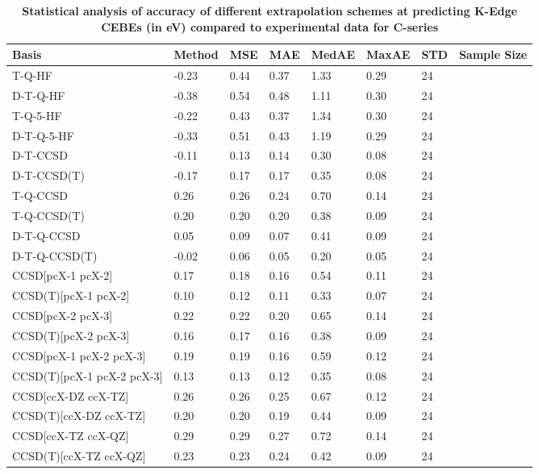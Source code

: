 \begin{table}
  \caption{\textbf{Statistical analysis of accuracy of different extrapolation schemes at predicting K-Edge CEBEs (in eV) compared to experimental data for C-series}}
  \label{tbl:extrap-scheme-summary-c}
  \begin{tabular}{l l l l l l l l }
    \toprule
    \textbf{Basis} & \textbf{Method} & \textbf{MSE} & \textbf{MAE} & \textbf{MedAE} & \textbf{MaxAE} & \textbf{STD} & \textbf{Sample Size} \\ 
    \midrule
    T-Q-HF & -0.23 & 0.44 & 0.37 & 1.33 & 0.29 & 24 \\ 
    D-T-Q-HF & -0.38 & 0.54 & 0.48 & 1.11 & 0.30 & 24 \\ 
    T-Q-5-HF & -0.22 & 0.43 & 0.37 & 1.34 & 0.30 & 24 \\ 
    D-T-Q-5-HF & -0.33 & 0.51 & 0.43 & 1.19 & 0.29 & 24 \\ 
    D-T-CCSD & -0.11 & 0.13 & 0.14 & 0.30 & 0.08 & 24 \\ 
    D-T-CCSD(T) & -0.17 & 0.17 & 0.17 & 0.35 & 0.08 & 24 \\ 
    T-Q-CCSD & 0.26 & 0.26 & 0.24 & 0.70 & 0.14 & 24 \\ 
    T-Q-CCSD(T) & 0.20 & 0.20 & 0.20 & 0.38 & 0.09 & 24 \\ 
    D-T-Q-CCSD & 0.05 & 0.09 & 0.07 & 0.41 & 0.09 & 24 \\ 
    D-T-Q-CCSD(T) & -0.02 & 0.06 & 0.05 & 0.20 & 0.05 & 24 \\ 
    CCSD[pcX-1 pcX-2] & 0.17 & 0.18 & 0.16 & 0.54 & 0.11 & 24 \\ 
    CCSD(T)[pcX-1 pcX-2] & 0.10 & 0.12 & 0.11 & 0.33 & 0.07 & 24 \\ 
    CCSD[pcX-2 pcX-3] & 0.22 & 0.22 & 0.20 & 0.65 & 0.14 & 24 \\ 
    CCSD(T)[pcX-2 pcX-3] & 0.16 & 0.17 & 0.16 & 0.38 & 0.09 & 24 \\ 
    CCSD[pcX-1 pcX-2 pcX-3] & 0.19 & 0.19 & 0.16 & 0.59 & 0.12 & 24 \\ 
    CCSD(T)[pcX-1 pcX-2 pcX-3] & 0.13 & 0.13 & 0.12 & 0.35 & 0.08 & 24 \\ 
    CCSD[ccX-DZ ccX-TZ] & 0.26 & 0.26 & 0.25 & 0.67 & 0.12 & 24 \\ 
    CCSD(T)[ccX-DZ ccX-TZ] & 0.20 & 0.20 & 0.19 & 0.44 & 0.09 & 24 \\ 
    CCSD[ccX-TZ ccX-QZ] & 0.29 & 0.29 & 0.27 & 0.72 & 0.14 & 24 \\ 
    CCSD(T)[ccX-TZ ccX-QZ] & 0.23 & 0.23 & 0.24 & 0.42 & 0.09 & 24 \\ 

\end{tabular}
\end{table}
